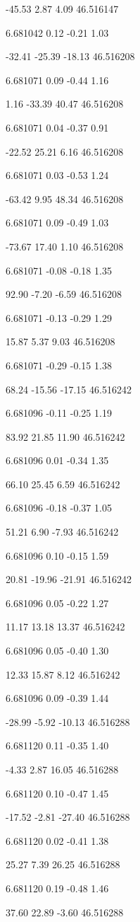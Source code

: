 -45.53
2.87
4.09
46.516147

6.681042
0.12
-0.21
1.03

-32.41
-25.39
-18.13
46.516208

6.681071
0.09
-0.44
1.16

1.16
-33.39
40.47
46.516208

6.681071
0.04
-0.37
0.91

-22.52
25.21
6.16
46.516208

6.681071
0.03
-0.53
1.24

-63.42
9.95
48.34
46.516208

6.681071
0.09
-0.49
1.03

-73.67
17.40
1.10
46.516208

6.681071
-0.08
-0.18
1.35

92.90
-7.20
-6.59
46.516208

6.681071
-0.13
-0.29
1.29

15.87
5.37
9.03
46.516208

6.681071
-0.29
-0.15
1.38

68.24
-15.56
-17.15
46.516242

6.681096
-0.11
-0.25
1.19

83.92
21.85
11.90
46.516242

6.681096
0.01
-0.34
1.35

66.10
25.45
6.59
46.516242

6.681096
-0.18
-0.37
1.05

51.21
6.90
-7.93
46.516242

6.681096
0.10
-0.15
1.59

20.81
-19.96
-21.91
46.516242

6.681096
0.05
-0.22
1.27

11.17
13.18
13.37
46.516242

6.681096
0.05
-0.40
1.30

12.33
15.87
8.12
46.516242

6.681096
0.09
-0.39
1.44

-28.99
-5.92
-10.13
46.516288

6.681120
0.11
-0.35
1.40

-4.33
2.87
16.05
46.516288

6.681120
0.10
-0.47
1.45

-17.52
-2.81
-27.40
46.516288

6.681120
0.02
-0.41
1.38

25.27
7.39
26.25
46.516288

6.681120
0.19
-0.48
1.46

37.60
22.89
-3.60
46.516288

